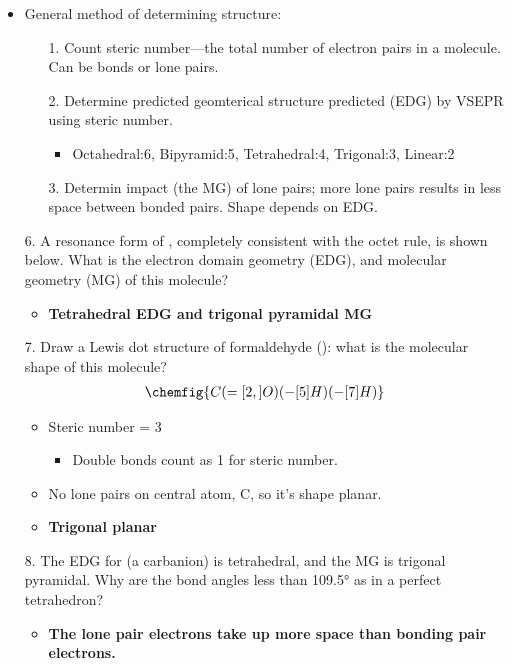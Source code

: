 \documentclass[12pt,a4paper]{article}
\begin{document}
\begin{itemize}
\begin{itemize}
        \end{itemize}
    \item General method of determining structure:
    \begin{itemize}
        \item[1.] Count steric number---the total number of electron pairs in a molecule. Can be bonds or lone pairs.
        \item[2.] Determine predicted geomterical structure predicted (EDG) by VSEPR using steric number.
            \begin{itemize}
                \item Octahedral:6, Bipyramid:5, Tetrahedral:4, Trigonal:3, Linear:2
            \end{itemize}
        \item[3.] Determin impact (the MG) of lone pairs; more lone pairs results in less space between bonded pairs. Shape depends on EDG.
    \end{itemize}
    \item[6.] A resonance form of , completely consistent with the octet rule,  is shown below.  What is the electron domain geometry (EDG), and molecular geometry (MG) of this molecule?
        \begin{itemize}
            \item \textbf{Tetrahedral EDG and trigonal pyramidal MG}
        \end{itemize}
    \item[7.] Draw a Lewis dot structure of formaldehyde (): what is the molecular shape of this molecule?
        \begin{align*}
            \chemfig{C(=[2,]O)(-[5]H)(-[7]H)}
        \end{align*}
        \begin{itemize}
            \item Steric number = 3
                \begin{itemize}
                    \item Double bonds count as 1 for steric number.
                \end{itemize}
            \item No lone pairs on central atom, C, so it's shape planar. 
            \item \textbf{Trigonal planar}
        \end{itemize}
    \item[8.] The EDG for  (a carbanion) is tetrahedral, and the MG is trigonal pyramidal.  Why are the  bond angles less than \ang{109.5} as in a perfect tetrahedron? 
        \begin{itemize}
            \item \textbf{The lone pair electrons take up more space than bonding pair electrons.}
        \end{itemize}
\end{itemize}
\end{document}

